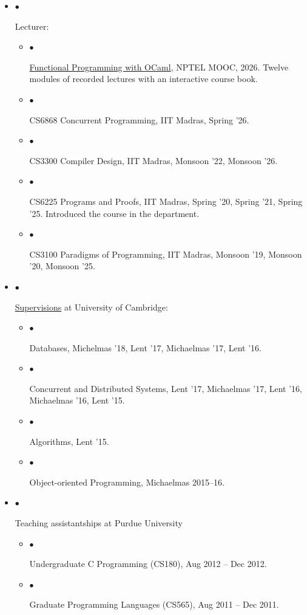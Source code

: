 \documentclass[10pt]{article}
\newcommand{\lbar}[1]{{\color{#1}\ding{118}}\hspace*{2pt}}
\newcommand{\service}[1]{\item $\bullet$ \hspace{1ex}\parbox{7.2in}{#1}}
\newenvironment{itemregion}[1]{
  \Needspace{5\baselineskip}
  \vspace*{0.5ex}
  {\scalebox{1.4}{\textbf{#1}}}
  \begin{itemize}\itemsep1pt}
  {\end{itemize}\vspace{0.8ex}}
\begin{document}
\begin{itemregion}{\lbar{red}Teaching}
  \service{Lecturer:}
  \begin{itemize}
    \service{\href{https://onlinecourses.nptel.ac.in/e-learning/preview/noc26_cs90}{Functional Programming with OCaml}, NPTEL MOOC, 2026. Twelve modules of recorded lectures with an interactive course book.}
			\service{CS6868 Concurrent Programming, IIT Madras, Spring '26.}
			\service{CS3300 Compiler Design, IIT Madras, Monsoon '22, Monsoon '26.}
			\service{CS6225 Programs and Proofs, IIT Madras, Spring '20, Spring '21, Spring '25. Introduced the course in the department.}
			\service{CS3100 Paradigms of Programming, IIT Madras, Monsoon '19, Monsoon '20, Monsoon '25.}
	\end{itemize}
  \service{\href{https://en.wikipedia.org/wiki/Tutorial_system}{Supervisions} at University of Cambridge:}
  \begin{itemize}
    \service{Databases, Michelmas '18, Lent '17, Michaelmas '17, Lent '16.}
    \service{Concurrent and Distributed Systems, Lent '17, Michaelmas '17, Lent '16, Michaelmas '16, Lent '15.}
    \service{Algorithms, Lent '15.}
    \service{Object-oriented Programming, Michaelmas 2015--16.}
  \end{itemize}
  \service{Teaching assistantships at Purdue University}
  \begin{itemize}
    \service{Undergraduate C Programming (CS180), Aug 2012 -- Dec 2012.}
    \service{Graduate Programming Languages (CS565), Aug 2011 -- Dec 2011.}
  \end{itemize}
\end{itemregion}
\end{document}
